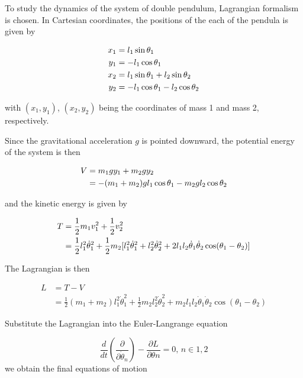 \documentclass{article}
\begin{document}
To study the dynamics of the system of double pendulum, Lagrangian formalism is chosen. In Cartesian coordinates, the positions of the each of the pendula is given by

\begin{align}
\centering
x_1 &= l_1 \sin\theta_1 \\
y_1 &= -l_1\cos\theta_1 \\
x_2 &= l_1\sin\theta_1 + l_2\sin\theta_2\\
y_2 &= -l_1\cos\theta_1 - l_2 \cos\theta_2
\end{align}

with $(x_1, y_1)$, $(x_2, y_2)$ being the coordinates of mass 1 and mass 2, respectively.

Since the gravitational acceleration $g$ is pointed downward, the potential energy of the system is then

\begin{align}
\centering
V &= m_1gy_1 + m_2gy_2 \\
	&= -(m_1 + m_2)gl_1\cos\theta_1 - m_2gl_2\cos\theta_2
\end{align}

and the kinetic energy is given by


\begin{equation}
\centering
\begin{split}
T &= \frac{1}{2}m_1v_1^2+\frac{1}{2}v_2^2 \\
&= \frac{1}{2}l_1^2\dot{\theta}_1^2 + \frac{1}{2}m_2[l_1^2\dot{\theta}_1^2 + l_2^2\dot{\theta}_2^2 + 2l_1l_2\dot{\theta}_1\dot{\theta}_2\cos(\theta_1 - \theta_2)]
\end{split}
\end{equation}

The Lagrangian is then

\begin{equation}
\begin{split}
L &= T - V \\
&= \frac{1}{2}(m_1+m_2)l_1^2\dot{\theta}_1^2 + \frac{1}{2}m_2l_2^2\dot{\theta}_2^2 + m_2l_1l_2\dot{\theta}_1\dot{\theta}_2\cos(\theta_1 - \theta_2)
\end{split}
\end{equation}

Substitute the Lagrangian into the Euler-Langrange equation

\begin{equation}
\frac{d}{dt} \left(\frac{\partial}{\partial \dot{\theta}_n} \right) - \frac{\partial L}{\partial \theta n} = 0, \, n \in {1, 2}
\end{equation}
we obtain the final equations of motion
\end{document}
